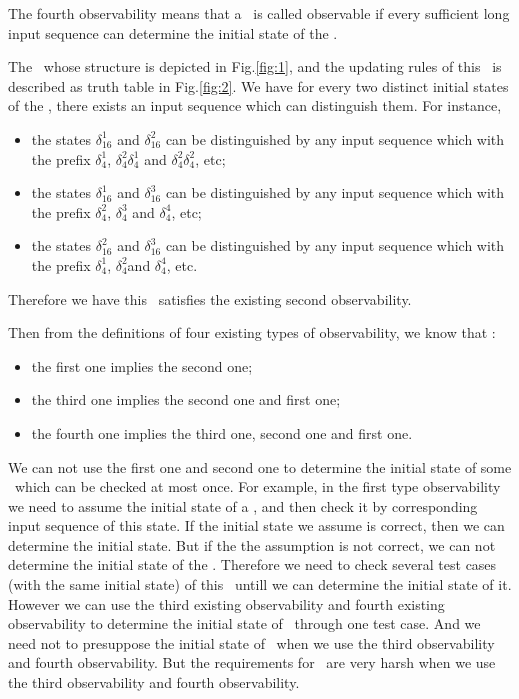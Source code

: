The fourth observability means that a \BCN\ is called observable if every sufficient long input sequence can determine the initial state of the \BCN.
\begin{example}
The \BCN\ whose structure is depicted in Fig.\ref{fig:1}, and the updating rules of this \BCN\ is described as truth table in Fig.\ref{fig:2}.  We have for every two distinct initial states of the \BCN, there exists an input sequence which can distinguish them.  For instance,
\begin{itemize}
  \item the states $\delta_{16}^1$ and $\delta_{16}^2$ can be distinguished by any input sequence which with the prefix $\delta_{4}^1$, $\delta_{4}^2 \delta_{4}^1$ and $\delta_{4}^2 \delta_{4}^2$, etc;
  \item the states $\delta_{16}^1$ and $\delta_{16}^3$  can be distinguished by any input sequence which with the prefix $\delta_{4}^2$, $\delta_{4}^3$ and $\delta_{4}^4$, etc;
  \item the states $\delta_{16}^2$ and $\delta_{16}^3$  can be distinguished by any input sequence which with the prefix $\delta_{4}^1$, $\delta_{4}^2$and $\delta_{4}^4$, etc.
\end{itemize} 
Therefore we have this \BCN\ satisfies the existing second observability.
\end{example}  
Then from the definitions of  four existing types of observability, we know that \cite{Zhang2016Observability}:
\begin{itemize}
  \item the first one implies the second one;
  \item the third one implies the second one and first one;
  \item the fourth one implies the third one, second one and first one.
\end{itemize} 
 
We can not use the first one and second one to determine the initial state of some \BCNs\ which can be checked at most once. For example, in the first type observability we need to assume the initial state of a \BCN, and then check it by corresponding input sequence of this state. If the initial state we assume is correct, then we can determine the initial state. But if the the assumption is not correct, we can not determine the initial state of the \BCN. Therefore we need to check several test cases (with the same initial state) of this \BCN\ untill we can determine the initial state of it. However we can use the third existing observability and fourth existing observability to determine the initial state of \BCNs\ through one test case. And we need not to presuppose the initial state of \BCNs\ when we use the third observability and fourth observability. But the requirements for \BCNs\ are very harsh when we use the third observability and fourth observability.
 
